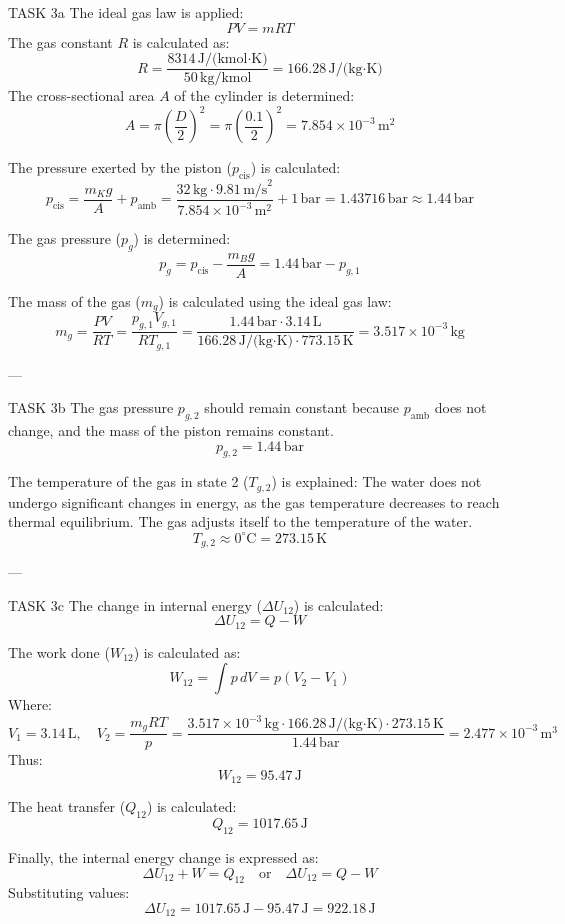 TASK 3a  
The ideal gas law is applied:  
\[
PV = mRT
\]  
The gas constant \( R \) is calculated as:  
\[
R = \frac{8314 \, \text{J/(kmol·K)}}{50 \, \text{kg/kmol}} = 166.28 \, \text{J/(kg·K)}
\]  
The cross-sectional area \( A \) of the cylinder is determined:  
\[
A = \pi \left(\frac{D}{2}\right)^2 = \pi \left(\frac{0.1}{2}\right)^2 = 7.854 \times 10^{-3} \, \text{m}^2
\]  

The pressure exerted by the piston (\( p_{\text{cis}} \)) is calculated:  
\[
p_{\text{cis}} = \frac{m_K g}{A} + p_{\text{amb}} = \frac{32 \, \text{kg} \cdot 9.81 \, \text{m/s}^2}{7.854 \times 10^{-3} \, \text{m}^2} + 1 \, \text{bar} = 1.43716 \, \text{bar} \approx 1.44 \, \text{bar}
\]  

The gas pressure (\( p_g \)) is determined:  
\[
p_g = p_{\text{cis}} - \frac{m_B g}{A} = 1.44 \, \text{bar} - p_{g,1}
\]  

The mass of the gas (\( m_g \)) is calculated using the ideal gas law:  
\[
m_g = \frac{PV}{RT} = \frac{p_{g,1} V_{g,1}}{R T_{g,1}} = \frac{1.44 \, \text{bar} \cdot 3.14 \, \text{L}}{166.28 \, \text{J/(kg·K)} \cdot 773.15 \, \text{K}} = 3.517 \times 10^{-3} \, \text{kg}
\]  

---

TASK 3b  
The gas pressure \( p_{g,2} \) should remain constant because \( p_{\text{amb}} \) does not change, and the mass of the piston remains constant.  
\[
p_{g,2} = 1.44 \, \text{bar}
\]  

The temperature of the gas in state 2 (\( T_{g,2} \)) is explained:  
The water does not undergo significant changes in energy, as the gas temperature decreases to reach thermal equilibrium. The gas adjusts itself to the temperature of the water.  
\[
T_{g,2} \approx 0^\circ\text{C} = 273.15 \, \text{K}
\]  

---

TASK 3c  
The change in internal energy (\( \Delta U_{12} \)) is calculated:  
\[
\Delta U_{12} = Q - W
\]  

The work done (\( W_{12} \)) is calculated as:  
\[
W_{12} = \int p \, dV = p (V_2 - V_1)
\]  
Where:  
\[
V_1 = 3.14 \, \text{L}, \quad V_2 = \frac{m_g RT}{p} = \frac{3.517 \times 10^{-3} \, \text{kg} \cdot 166.28 \, \text{J/(kg·K)} \cdot 273.15 \, \text{K}}{1.44 \, \text{bar}} = 2.477 \times 10^{-3} \, \text{m}^3
\]  
Thus:  
\[
W_{12} = 95.47 \, \text{J}
\]  

The heat transfer (\( Q_{12} \)) is calculated:  
\[
Q_{12} = 1017.65 \, \text{J}
\]  

Finally, the internal energy change is expressed as:  
\[
\Delta U_{12} + W = Q_{12} \quad \text{or} \quad \Delta U_{12} = Q - W
\]  
Substituting values:  
\[
\Delta U_{12} = 1017.65 \, \text{J} - 95.47 \, \text{J} = 922.18 \, \text{J}
\]  

